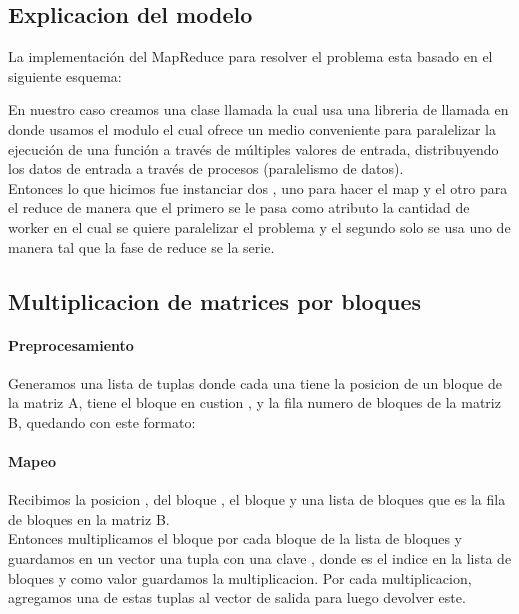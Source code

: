 \subsection{Explicacion del modelo}
    La implementación del MapReduce para resolver el problema esta basado en el
    siguiente esquema:\\

    \def\text{Esquema de un map reduce}
    \def\path{map_reduce_schema.png}
    \def\scale{.6}
    

    En nuestro caso creamos una clase llamada  la cual usa una
    libreria de  llamada  en donde usamos el
    modulo  el cual ofrece un medio conveniente para paralelizar la
    ejecución de una función a través de múltiples valores de entrada, distribuyendo
    los datos de entrada a través de procesos (paralelismo de datos).\\

    Entonces lo que hicimos fue instanciar dos , uno para hacer el map y
    el otro para el reduce de manera que el primero se le pasa como atributo la
    cantidad de worker en el cual se quiere paralelizar el problema y el segundo
    solo se usa uno de manera tal que la fase de reduce se la serie.

\subsection{Multiplicacion de matrices por bloques}

    \paragraph{Preprocesamiento}

        Generamos una lista de tuplas donde cada una tiene la posicion
         de un bloque de la matriz A, tiene el bloque en
        custion , y la fila numero  de bloques de la
        matriz B, quedando con este formato: \\

    \paragraph{Mapeo}

        Recibimos la posicion ,  del bloque , el bloque
         y una lista de bloques  que es la fila  de
        bloques en la matriz B.\\
        Entonces multiplicamos el bloque  por cada bloque de la lista de
        bloques  y guardamos en un vector una tupla con una clave
        ,  donde  es el indice en la lista de
        bloques  y como valor guardamos la multiplicacion. Por cada
        multiplicacion, agregamos una de estas tuplas al vector de salida para
        luego devolver este.

